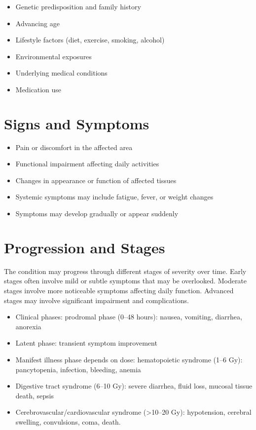 \begin{itemize}[noitemsep]
  \item Genetic predisposition and family history
  \item Advancing age
  \item Lifestyle factors (diet, exercise, smoking, alcohol)
  \item Environmental exposures
  \item Underlying medical conditions
  \item Medication use
\end{itemize}
\section{Signs and Symptoms}
\begin{itemize}[noitemsep]
  \item Pain or discomfort in the affected area
  \item Functional impairment affecting daily activities
  \item Changes in appearance or function of affected tissues
  \item Systemic symptoms may include fatigue, fever, or weight changes
  \item Symptoms may develop gradually or appear suddenly
\end{itemize}
\section{Progression and Stages}
The condition may progress through different stages of severity over time. Early stages often involve mild or subtle symptoms that may be overlooked. Moderate stages involve more noticeable symptoms affecting daily function. Advanced stages may involve significant impairment and complications.

\begin{itemize}[noitemsep]
  \item Clinical phases: prodromal phase (0--48 hours): nausea, vomiting, diarrhea, anorexia
  \item Latent phase: transient symptom improvement
  \item Manifest illness phase depends on dose: hematopoietic syndrome (1--6 Gy): pancytopenia, infection, bleeding, anemia
  \item Digestive tract syndrome (6--10 Gy): severe diarrhea, fluid loss, mucosal tissue death, sepsis
  \item Cerebrovascular/cardiovascular syndrome (>10--20 Gy): hypotension, cerebral swelling, convulsions, coma, death.
\end{itemize}
